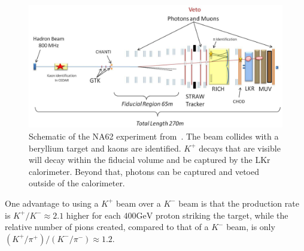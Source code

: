 \begin{figure}[h]
    \centering
    \includegraphics[width=\textwidth]{Figures/experiments/na62_schematic}
    \caption[Schematic of the NA62 experiment.]{Schematic of the NA62 experiment from~\cite{Martellotti:2015kna}. The beam collides with a beryllium target and kaons are identified. $K^+$ decays that are visible will decay within the fiducial volume and be captured by the LKr calorimeter. Beyond that, photons can be captured and vetoed outside of the calorimeter.}
    \label{fig:na62_experiment}
\end{figure}

One advantage to using a $K^+$ beam over a $K^-$ beam is that the production rate is $K^+ / K^- \approx 2.1$ higher for each $400\textrm{GeV}$ proton striking the target, while the relative number of pions created, compared to that of a $K^-$ beam, is only $(K^+ / \pi^+) / (K^- / \pi^-) \approx 1.2$.

